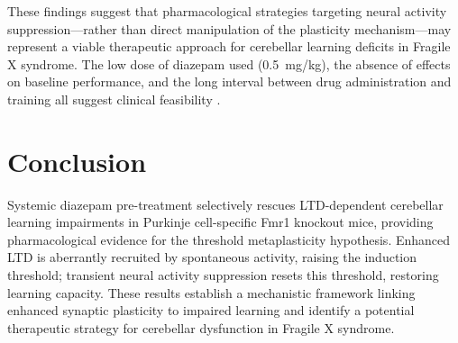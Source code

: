 \documentclass[11pt]{article}
\begin{document}
These findings suggest that pharmacological strategies targeting neural activity suppression---rather than direct manipulation of the plasticity mechanism---may represent a viable therapeutic approach for cerebellar learning deficits in Fragile X syndrome. The low dose of diazepam used (0.5~mg/kg), the absence of effects on baseline performance, and the long interval between drug administration and training all suggest clinical feasibility \citep{rudolph2004beyond}.

\section{Conclusion}

Systemic diazepam pre-treatment selectively rescues LTD-dependent cerebellar learning impairments in Purkinje cell-specific Fmr1 knockout mice, providing pharmacological evidence for the threshold metaplasticity hypothesis. Enhanced LTD is aberrantly recruited by spontaneous activity, raising the induction threshold; transient neural activity suppression resets this threshold, restoring learning capacity. These results establish a mechanistic framework linking enhanced synaptic plasticity to impaired learning and identify a potential therapeutic strategy for cerebellar dysfunction in Fragile X syndrome.



\end{document}

